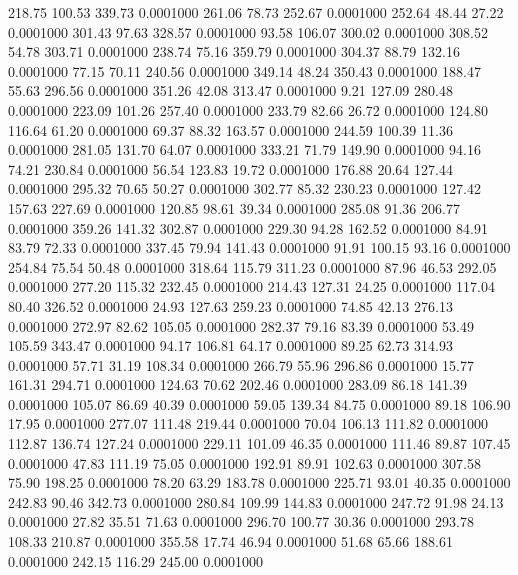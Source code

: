  218.75  100.53  339.73   0.0001000
 261.06   78.73  252.67   0.0001000
 252.64   48.44   27.22   0.0001000
 301.43   97.63  328.57   0.0001000
  93.58  106.07  300.02   0.0001000
 308.52   54.78  303.71   0.0001000
 238.74   75.16  359.79   0.0001000
 304.37   88.79  132.16   0.0001000
  77.15   70.11  240.56   0.0001000
 349.14   48.24  350.43   0.0001000
 188.47   55.63  296.56   0.0001000
 351.26   42.08  313.47   0.0001000
   9.21  127.09  280.48   0.0001000
 223.09  101.26  257.40   0.0001000
 233.79   82.66   26.72   0.0001000
 124.80  116.64   61.20   0.0001000
  69.37   88.32  163.57   0.0001000
 244.59  100.39   11.36   0.0001000
 281.05  131.70   64.07   0.0001000
 333.21   71.79  149.90   0.0001000
  94.16   74.21  230.84   0.0001000
  56.54  123.83   19.72   0.0001000
 176.88   20.64  127.44   0.0001000
 295.32   70.65   50.27   0.0001000
 302.77   85.32  230.23   0.0001000
 127.42  157.63  227.69   0.0001000
 120.85   98.61   39.34   0.0001000
 285.08   91.36  206.77   0.0001000
 359.26  141.32  302.87   0.0001000
 229.30   94.28  162.52   0.0001000
  84.91   83.79   72.33   0.0001000
 337.45   79.94  141.43   0.0001000
  91.91  100.15   93.16   0.0001000
 254.84   75.54   50.48   0.0001000
 318.64  115.79  311.23   0.0001000
  87.96   46.53  292.05   0.0001000
 277.20  115.32  232.45   0.0001000
 214.43  127.31   24.25   0.0001000
 117.04   80.40  326.52   0.0001000
  24.93  127.63  259.23   0.0001000
  74.85   42.13  276.13   0.0001000
 272.97   82.62  105.05   0.0001000
 282.37   79.16   83.39   0.0001000
  53.49  105.59  343.47   0.0001000
  94.17  106.81   64.17   0.0001000
  89.25   62.73  314.93   0.0001000
  57.71   31.19  108.34   0.0001000
 266.79   55.96  296.86   0.0001000
  15.77  161.31  294.71   0.0001000
 124.63   70.62  202.46   0.0001000
 283.09   86.18  141.39   0.0001000
 105.07   86.69   40.39   0.0001000
  59.05  139.34   84.75   0.0001000
  89.18  106.90   17.95   0.0001000
 277.07  111.48  219.44   0.0001000
  70.04  106.13  111.82   0.0001000
 112.87  136.74  127.24   0.0001000
 229.11  101.09   46.35   0.0001000
 111.46   89.87  107.45   0.0001000
  47.83  111.19   75.05   0.0001000
 192.91   89.91  102.63   0.0001000
 307.58   75.90  198.25   0.0001000
  78.20   63.29  183.78   0.0001000
 225.71   93.01   40.35   0.0001000
 242.83   90.46  342.73   0.0001000
 280.84  109.99  144.83   0.0001000
 247.72   91.98   24.13   0.0001000
  27.82   35.51   71.63   0.0001000
 296.70  100.77   30.36   0.0001000
 293.78  108.33  210.87   0.0001000
 355.58   17.74   46.94   0.0001000
  51.68   65.66  188.61   0.0001000
 242.15  116.29  245.00   0.0001000
